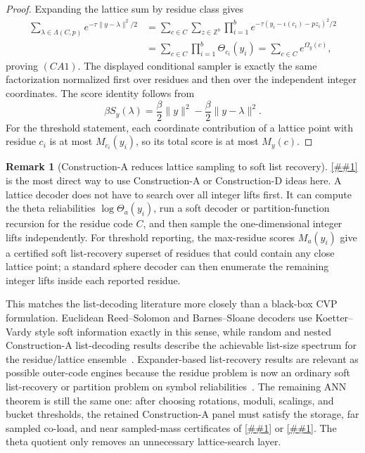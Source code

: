 \documentclass[10pt]{article}
\newcommand{\cref}[1]{\ref{##1}}
\newcommand{\Cref}[1]{\ref{##1}}
\theoremstyle{definition}
\newtheorem{remark}[theorem]{Remark}
\begin{document}
\begin{proof}
   Expanding the lattice sum by residue class gives
   \[
   \begin{aligned}
      \sum_{\lambda\in\Lambda(C,p)}
      e^{-\tau\|y-\lambda\|^2/2}
      &=
      \sum_{c\in C}
      \sum_{z\in\mathbb Z^b}
      \prod_{i=1}^b
      e^{-\tau(y_i-\iota(c_i)-pz_i)^2/2}  \\
      &=
      \sum_{c\in C}\prod_{i=1}^b\Theta_{c_i}(y_i)
      =
      \sum_{c\in C}e^{\Omega_y(c)} ,
   \end{aligned}
   \]
   proving \((CA1)\).  The displayed conditional sampler is exactly the same
   factorization normalized first over residues and then over the independent
   integer coordinates.  The score identity follows from
   \[
      \beta S_y(\lambda)
      =
      \frac{\beta}{2}\|y\|^2
      -
      \frac{\beta}{2}\|y-\lambda\|^2 .
   \]
   For the threshold statement, each coordinate contribution of a lattice point
   with residue \(c_i\) is at most \(M_{c_i}(y_i)\), so its total score is at
   most \(M_y(c)\).
\end{proof}

\begin{remark}[Construction-A reduces lattice sampling to soft list recovery]
   \label{rem:construction-a-soft-decoding}
   \Cref{lem:construction-a-theta-quotient} is the most direct way to use
   Construction-A or Construction-D ideas here.  A lattice decoder does not have
   to search over all integer lifts first.  It can compute the theta
   reliabilities \(\log\Theta_a(y_i)\), run a soft decoder or partition-function
   recursion for the residue code \(C\), and then sample the one-dimensional
   integer lifts independently.  For threshold reporting, the max-residue scores
   \(M_a(y_i)\) give a certified soft list-recovery superset of residues that
   could contain any close lattice point; a standard sphere decoder can then
   enumerate the remaining integer lifts inside each reported residue.

   This matches the list-decoding literature more closely than a black-box CVP
   formulation.  Euclidean Reed--Solomon and Barnes--Sloane decoders use
   Koetter--Vardy style soft information exactly in this sense, while random and
   nested Construction-A list-decoding results describe the achievable list-size
   spectrum for the residue/lattice ensemble~\cite{MP20,ZV21}.  Expander-based
   list-recovery results are relevant as possible outer-code engines because
   the residue problem is now an ordinary soft list-recovery or partition
   problem on symbol reliabilities~\cite{ST25}.  The remaining ANN theorem is
   still the same one: after choosing rotations, moduli, scalings, and bucket
   thresholds, the retained Construction-A panel must satisfy the storage,
   far sampled co-load, and near sampled-mass certificates of
   \cref{cor:weighted-gaussian-quadrature-panel} or
   \cref{cor:bucket-quotient-quadrature}.  The theta quotient only removes an
   unnecessary lattice-search layer.
\end{remark}
\end{document}

